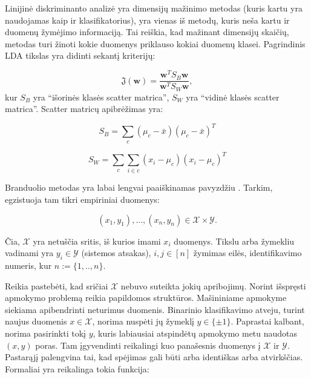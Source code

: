\documentclass[]{vgtuef}
\begin{document}
Linijinė diskriminanto analizė \cite{welling2005fisher} yra dimensijų mažinimo metodas (kuris kartu yra naudojamas kaip ir klasifikatorius), yra vienas iš metodų, kuris neša kartu ir duomenų žymėjimo informaciją. Tai reiškia, kad mažinant dimensijų skaičių, metodas turi žinoti kokie duomenys priklauso kokiai duomenų klasei. Pagrindinis LDA tikslas yra didinti sekantį kriterijų:

\begin{equation}
  \mathfrak{J}(\mathbf{w}) = \frac{ \mathbf{w}^T S_B \mathbf{w} }{
    \mathbf{w}^T S_W \mathbf{w} },
\end{equation}
kur $S_B$ yra ``išorinės klasės scatter matrica'', $S_W$ yra ``vidinė klasės scatter matrica''. Scatter matricų apibrėžimas yra:

\begin{equation}
  S_B = \sum_c (\mu_c - \bar{x})(\mu_c - \bar{x})^T
\end{equation}

\begin{equation}
  S_W = \sum_c \sum_{i \in c} ( x_i - \mu_c)(x_i - \mu_c)^T
\end{equation}


Branduolio metodas yra labai lengvai paaiškinamas pavyzdžiu \cite{2007math......1907H}. Tarkim, egzistuoja tam tikri empiriniai duomenys:

\begin{equation}
  (x_1,y_1),...,(x_n,y_n) \in \mathcal{X} \times \mathcal{Y}.
\end{equation}

Čia, $\mathcal{X}$ yra netuščia sritis, iš kurios imami $x_i$ duomenys. Tikslu arba žymekliu vadinami yra $y_i \in \mathcal{Y}$ (sistemos atsakas), $i,j \in [n]$ žymimas eilės, identifikavimo numeris, kur $n := \{1,..,n\}$.

Reikia pastebėti, kad sričiai $\mathcal{X}$ nebuvo suteikta jokių apribojimų. Norint išspręsti apmokymo problemą reikia papildomos struktūros. Mašininiame apmokyme siekiama apibendrinti neturimus duomenis. Binarinio klasifikavimo atveju, turint naujus duomenis $x \in \mathcal{X}$, norima nuspėti jų žymeklį $y \in \{\pm 1\}$. Paprastai kalbant, norima pasirinkti tokį $y$, kuris labiausiai atspindėtų apmokymo metu naudotas $(x,y)$ poras. Tam įgyvendinti reikalingi kuo panašesnis duomenys į $\mathcal{X}$ ir $\mathcal{Y}$. Pastarąjį palengvina tai, kad spėjimas gali būti arba identiškas arba atvirkščias. Formaliai yra reikalinga tokia funkcija:
\end{document}
